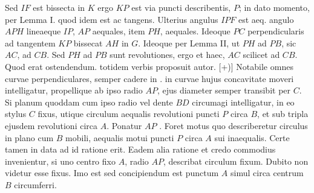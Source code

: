 \pend 
\pstart Sed $IF$ est bissecta in $K$ ergo $KP$ est via puncti describentis, $P$; in dato momento, per Lemma I. quod idem est ac tangens. 
\pend 
\pstart Ulterius angulus $IPF$ est aeq. angulo $APH$ lineaeque $IP$, $AP$ aequales, item $PH$,  aequales. Ideoque $PC$ perpendicularis ad tangentem $KP$ bissecat $AH$ in $G$. Ideoque per Lemma II, ut $PH$ ad $PB$, sic $AC$, ad $CB$. Sed $PH$ ad $PB$ sunt revolutiones, ergo et haec, $AC$ scilicet ad $CB$. Quod erat ostendendum.  totidem verbis proposuit autor. [+)] 
\pend 
\pstart Notabile omnes curvae  perpendiculares, semper cadere in .  in curvae hujus concavitate moveri intelligatur, propellique ab ipso radio $AP$, ejus diameter semper transibit per $C$. Si planum quoddam cum ipso radio vel dente $BD$ circumagi intelligatur, in eo stylus $C$ fixus, utique circulum  aequalis revolutioni puncti $P$ circa $B$, et sub tripla ejusdem revolutioni circa $A$. Ponatur $AP$ . Foret motus quo describeretur circulus in plano cum $B$ mobili, aequalis motui puncti $P$ circa $A$ sui inaequalis. Certe tamen in data ad id ratione erit.
\pend
\pstart
Eadem alia ratione et credo commodius invenientur, si uno centro fixo $A$, radio $AP$, describat circulum fixum. Dubito non videtur esse fixus. Imo est sed concipiendum est punctum $A$ simul circa centrum $B$ circumferri.
